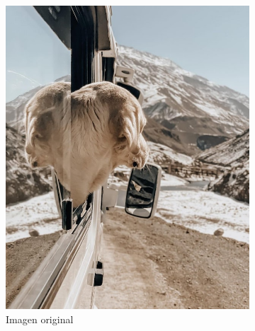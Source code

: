 \documentclass[a4paper, 12pt]{article}
\begin{document}
\begin{figure}[!ht]
    \centering
    \begin{subfigure}{0.4\textwidth}
        \includegraphics[width=\textwidth]{img/dog.jpg}
        \caption{Imagen original}
    \end{subfigure}
    \begin{subfigure}{0.4\textwidth}

\end{subfigure}
\end{figure}
\end{document}
